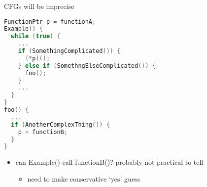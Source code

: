 \begin{frame}[fragile,label=imprecise]{CFGs will be imprecise}
\begin{lstlisting}[language=C++,style=smaller]
FunctionPtr p = functionA;
Example() {
  while (true) {
    ...
    if (SomethingComplicated()) {
      (*p)();
    } else if (SomethngElseComplicated()) {
      foo();
    }
    ...
  }
}
foo() {
  ...
  if (AnotherComplexThing()) {
    p = functionB;
  }
}
\end{lstlisting}
\begin{itemize}
\item can Example() call functionB()? probably not practical to tell
    \begin{itemize}
    \item need to make conservative `yes' guess
    \end{itemize}
\end{itemize}
\end{frame}
